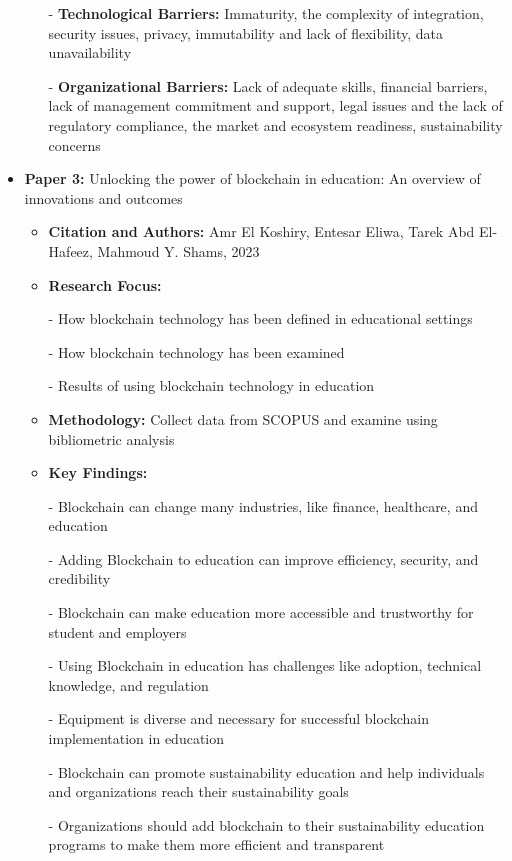\documentclass[12pt,a4paper]{article}
\begin{document}
\begin{itemize}
\begin{itemize}
        - \textbf{Technological Barriers:} Immaturity, the complexity of integration, security issues, privacy, immutability and lack of flexibility, data unavailability

        - \textbf{Organizational Barriers:} Lack of adequate skills, financial barriers, lack of management commitment and support, legal issues and the lack of regulatory compliance, the market and ecosystem readiness, sustainability concerns
    \end{itemize}
    \vspace{0.2cm}
    \item \textbf{Paper 3:} Unlocking the power of blockchain in education: An overview of innovations and outcomes
    \begin{itemize}
        \item \textbf{Citation and Authors:} Amr El Koshiry, Entesar Eliwa, Tarek Abd El-Hafeez, Mahmoud Y. Shams, 2023 \cite{p3}
        \item \textbf{Research Focus:}
        
        - How blockchain technology has been defined in educational settings

        - How blockchain technology has been examined

        - Results of using blockchain technology in education
        \item \textbf{Methodology:} Collect data from SCOPUS and examine using bibliometric analysis
        \item \textbf{Key Findings:} 

        - Blockchain can change many industries, like finance, healthcare, and education

        - Adding Blockchain to education can improve efficiency, security, and credibility

        - Blockchain can make education more accessible and trustworthy for student and employers

        - Using Blockchain in education has challenges like adoption, technical knowledge, and regulation

        - Equipment is diverse and necessary for successful blockchain implementation in education

        - Blockchain can promote sustainability education and help individuals and organizations reach their sustainability goals

        - Organizations should add blockchain to their sustainability education programs to make them more efficient and transparent


\end{itemize}
\end{itemize}
\end{document}
